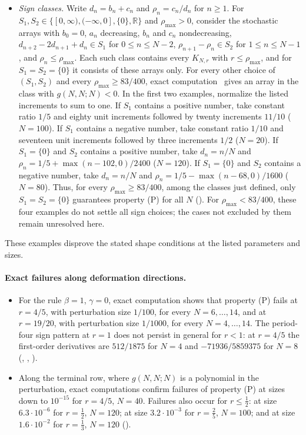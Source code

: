 \begin{itemize}
\item \emph{Sign classes.} Write $d_n=b_n+c_n$ and $\rho_n=c_n/d_n$ for $n\geq1$. For $S_1,S_2\in\{[0,\infty),(-\infty,0],\{0\},\mathbb R\}$ and $\rho_{\max}>0$, consider the stochastic arrays with $b_0=0$, $a_n$ decreasing, $b_n$ and $c_n$ nondecreasing, $d_{n+2}-2d_{n+1}+d_n\in S_1$ for $0\leq n\leq N-2$, $\rho_{n+1}-\rho_n\in S_2$ for $1\leq n\leq N-1$, and $\rho_n\leq\rho_{\max}$. Each such class contains every $K_{N,r}$ with $r\leq\rho_{\max}$, and for $S_1=S_2=\{0\}$ it consists of these arrays only. For every other choice of $(S_1,S_2)$ and every $\rho_{\max}\geq83/400$, exact computation~\cite{code} gives an array in the class with $g(N,N;N)<0$. In the first two examples, normalize the listed increments to sum to one. If $S_1$ contains a positive number, take constant ratio $1/5$ and eighty unit increments followed by twenty increments $11/10$ ($N=100$). If $S_1$ contains a negative number, take constant ratio $1/10$ and seventeen unit increments followed by three increments $1/2$ ($N=20$). If $S_1=\{0\}$ and $S_2$ contains a positive number, take $d_n=n/N$ and $\rho_n=1/5+\max(n-102,0)/2400$ ($N=120$). If $S_1=\{0\}$ and $S_2$ contains a negative number, take $d_n=n/N$ and $\rho_n=1/5-\max(n-68,0)/1600$ ($N=80$). Thus, for every $\rho_{\max}\geq83/400$, among the classes just defined, only $S_1=S_2=\{0\}$ guarantees property (P) for all $N$ (). For $\rho_{\max}<83/400$, these four examples do not settle all sign choices; the cases not excluded by them remain unresolved here.
\end{itemize}
These examples disprove the stated shape conditions at the listed parameters and sizes.

\paragraph{Exact failures along deformation directions.}
\begin{itemize}
\item For the rule $\beta=1$, $\gamma=0$, exact computation shows that property (P) fails at $r=4/5$, with perturbation size $1/100$, for every $N=6,\ldots,14$, and at $r=19/20$, with perturbation size $1/1000$, for every $N=4,\ldots,14$. The period-four sign pattern at $r=1$ does not persist in general for $r<1$: at $r=4/5$ the first-order derivatives are $512/1875$ for $N=4$ and $-71936/5859375$ for $N=8$ (, , ).
\item Along the terminal row, where $g(N,N;N)$ is a polynomial in the perturbation, exact computations confirm failures of property (P) at sizes down to $10^{-15}$ for $r=4/5$, $N=40$. Failures also occur for $r\leq\tfrac12$: at size $6.3\cdot10^{-6}$ for $r=\tfrac12$, $N=120$; at size $3.2\cdot10^{-3}$ for $r=\tfrac25$, $N=100$; and at size $1.6\cdot10^{-2}$ for $r=\tfrac13$, $N=120$ ().
\end{itemize}

